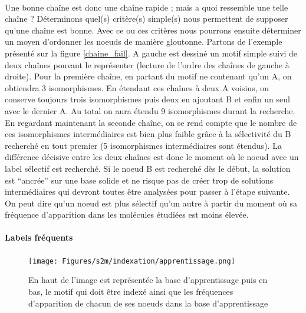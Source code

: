 \documentclass[12pt,french,twoside]{report}
\begin{document}
\paragraph{}Une bonne chaîne est donc une chaîne rapide ; mais a quoi ressemble une telle chaîne ? Déterminons quel(s) critère(s)
simple(s) nous permettent de supposer qu'une chaîne est bonne. Avec ce ou ces critères nous pourrons ensuite déterminer un
moyen d'ordonner les noeuds de manière gloutonne. Partons de l'exemple présenté sur la figure \ref{chaine_fail}. A gauche est
dessiné un motif simple suivi de deux chaînes pouvant le représenter (lecture de l'ordre des chaînes de gauche à droite). Pour
la première chaîne, en partant du motif ne contenant qu'un A, on obtiendra 3 isomorphismes. En étendant ces chaînes à deux A
voisins, on conserve toujours trois isomorphismes puis deux en ajoutant B et enfin un seul avec le dernier A. Au total on aura
étendu 9 isomorphismes durant la recherche. En regardant maintenant la seconde chaîne, on se rend compte que le nombre de ces
isomorphismes intermédiaires est bien plus faible grâce à la sélectivité du B recherché en tout premier (5 isomorphismes
intermédiaires sont étendus). La différence décisive entre les deux chaînes est donc le moment où le noeud avec un label sélectif
est recherché. Si le noeud B est recherché dès le début, la solution est ``ancrée'' sur une base solide et ne risque pas de 
créer trop de solutions intermédiaires qui devront toutes être analysées pour passer à l'étape suivante. On peut dire qu'un noeud
est plus sélectif qu'un autre à partir du moment où sa fréquence d'apparition dans les molécules étudiées est moins élevée.

\paragraph{Labels fréquents}

\begin{figure}
  \texttt{[image: Figures/s2m/indexation/apprentissage.png]}
  \caption{\label{apprentissage}En haut de l'image est représentée la base d'apprentissage puis en bas, le motif qui doit être
  indexé ainsi que les fréquences d'apparition de chacun de ses noeuds dans la base d'apprentissage}
\end{figure}
\end{document}
